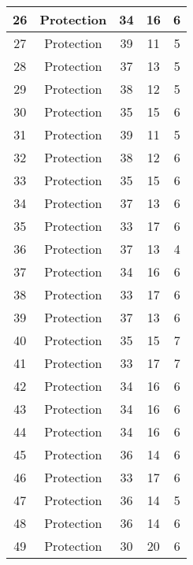 \documentclass[results.tex]{subfiles}
\begin{document}
\begin{center}
\begin{tabular}{| c || c | c | c | c |}
    \hline
    26 & Protection & 34 & 16 & 6 \\ 
    \hline
    27 & Protection & 39 & 11 & 5 \\ 
    \hline
    28 & Protection & 37 & 13 & 5 \\ 
    \hline
    29 & Protection & 38 & 12 & 5 \\ 
    \hline
    30 & Protection & 35 & 15 & 6 \\ 
    \hline
    31 & Protection & 39 & 11 & 5 \\ 
    \hline
    32 & Protection & 38 & 12 & 6 \\ 
    \hline
    33 & Protection & 35 & 15 & 6 \\ 
    \hline
    34 & Protection & 37 & 13 & 6 \\ 
    \hline
    35 & Protection & 33 & 17 & 6 \\ 
    \hline
    36 & Protection & 37 & 13 & 4 \\ 
    \hline
    37 & Protection & 34 & 16 & 6 \\ 
    \hline
    38 & Protection & 33 & 17 & 6 \\ 
    \hline
    39 & Protection & 37 & 13 & 6 \\ 
    \hline
    40 & Protection & 35 & 15 & 7 \\ 
    \hline
    41 & Protection & 33 & 17 & 7 \\ 
    \hline
    42 & Protection & 34 & 16 & 6 \\ 
    \hline
    43 & Protection & 34 & 16 & 6 \\ 
    \hline
    44 & Protection & 34 & 16 & 6 \\ 
    \hline
    45 & Protection & 36 & 14 & 6 \\ 
    \hline
    46 & Protection & 33 & 17 & 6 \\ 
    \hline
    47 & Protection & 36 & 14 & 5 \\ 
    \hline
    48 & Protection & 36 & 14 & 6 \\ 
    \hline
    49 & Protection & 30 & 20 & 6 \\ 
    \hline   \end{tabular}
\end{center}
\end{document}

